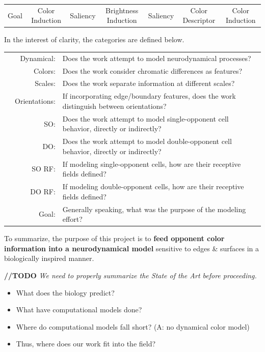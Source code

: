 \documentclass[journal,onecolumn]{IEEEtran}
\begin{document}
\begin{table}
\begin{threeparttable}
\begin{tabular}{rcccccc}
        \multicolumn{1}{r|}{Goal}             & Color Induction        & Saliency             & Brightness Induction           & Saliency              & Color Descriptor & Color Induction
    \end{tabular}
    \begin{tablenotes}
        \item In the interest of clarity, the categories are defined below.
        \begin{tabular}{p{1.5cm} r l}
            & Dynamical:    & Does the work attempt to model neurodynamical processes? \\
            & Colors:       & Does the work consider chromatic differences as features? \\
            & Scales:       & Does the work separate information at different scales? \\
            & Orientations: & If incorporating edge/boundary features, does the work distinguish between orientations? \\
            & SO:           & Does the work attempt to model single-opponent cell behavior, directly or indirectly? \\
            & DO:           & Does the work attempt to model double-opponent cell behavior, directly or indirectly? \\
            & SO RF:        & If modeling single-opponent cells, how are their receptive fields defined? \\
            & DO RF:        & If modeling double-opponent cells, how are their receptive fields defined? \\
            & Goal:         & Generally speaking, what was the purpose of the modeling effort?
        \end{tabular}
    \end{tablenotes}
    \end{threeparttable}
    \label{tab:model-comparison}
\end{table}

To summarize, the purpose of this project is to \textbf{feed opponent color information into a neurodynamical model} sensitive to edges \& surfaces in a biologically inspired manner.

\textbf{//TODO} \textit{We need to properly summarize the State of the Art before proceeding.}
\begin{itemize}
    \item What does the biology predict?
    \item What have computational models done?
    \item Where do computational models fall short? (A: no dynamical color model)
    \item Thus, where does our work fit into the field?
\end{itemize}
\end{document}
